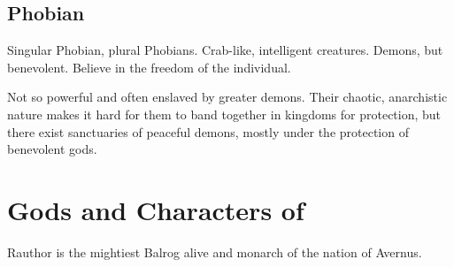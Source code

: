 \subsection{Phobian}
Singular Phobian, plural Phobians. Crab-like, intelligent creatures. Demons, but benevolent. Believe in the freedom of the individual. 

Not so powerful and often enslaved by greater demons. Their chaotic, anarchistic nature makes it hard for them to band together in kingdoms for protection, but there exist sanctuaries of peaceful demons, mostly under the protection of benevolent gods. 



\section{Gods and Characters of \Tuat{}}

\label{Rauthor}
Rauthor is the mightiest Balrog alive and monarch of the nation of Avernus. 

